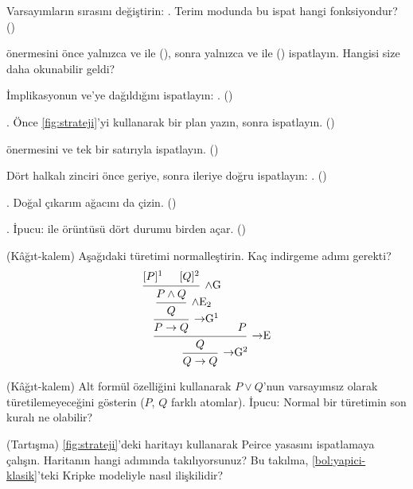 \begin{alistirmalar}
 Varsayımların sırasını değiştirin:
. Terim modunda bu ispat hangi
fonksiyondur? ()

  önermesini önce yalnızca
 ve  ile (), sonra yalnızca
 ve  ile () ispatlayın. Hangisi
size daha okunabilir geldi?

 İmplikasyonun ve'ye dağıldığını ispatlayın:
. ()

 . Önce
\cref{fig:strateji}'yi kullanarak bir plan yazın, sonra ispatlayın.
()

  önermesini 
ve tek bir  satırıyla ispatlayın.
()

 Dört halkalı zinciri önce geriye, sonra ileriye doğru
ispatlayın: . ()

 . Doğal çıkarım ağacını
da çizin. ()

 .
İpucu:  ile  örüntüsü dört durumu
birden açar. ()

 (Kâğıt-kalem) Aşağıdaki türetimi normalleştirin. Kaç
indirgeme adımı gerekti?
\[
\begin{prooftree}
  \hypo{[P]^{1}}
  \hypo{[Q]^{2}}
  \infer2[$\wedge$G]{P \wedge Q}
  \infer1[$\wedge$E$_2$]{Q}
  \infer1[$\to$G$^{1}$]{P \to Q}
  \hypo{P}
  \infer2[$\to$E]{Q}
  \infer1[$\to$G$^{2}$]{Q \to Q}
\end{prooftree}
\]

 (Kâğıt-kalem) Alt formül özelliğini kullanarak $P \vee Q$'nun
varsayımsız olarak türetilemeyeceğini gösterin ($P$, $Q$ farklı
atomlar). İpucu: Normal bir türetimin son kuralı ne olabilir?

 (Tartışma) \cref{fig:strateji}'deki haritayı kullanarak
Peirce yasasını ispatlamaya çalışın. Haritanın hangi adımında
takılıyorsunuz? Bu takılma, \cref{bol:yapici-klasik}'teki Kripke
modeliyle nasıl ilişkilidir?
\end{alistirmalar}
